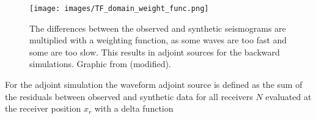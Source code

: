 \begin{figure}[h]
\begin{center}
\texttt{[image: images/TF\_domain\_weight\_func.png]}
\caption{The differences between the observed and synthetic seismograms are multiplied with a weighting function,
as some waves are too fast and some are too slow.
This results in adjoint sources for the backward simulations.
Graphic from \citealp{Fichtner2011}(modified).}
\label{weight_func}
\end{center}
\end{figure}



%
%







For the adjoint simulation the waveform adjoint source is defined as the sum of the residuals between observed and 
synthetic data for all receivers $N$ evaluated at the receiver position $x_r$ with a delta function 

